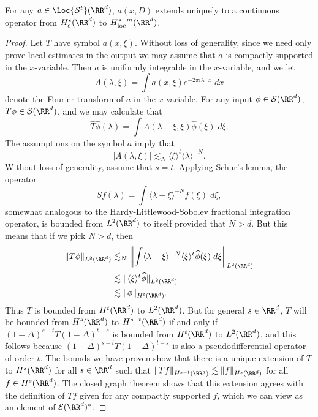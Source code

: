 \begin{theorem}
    For any $a \in \loc{\mathcal{S}^t}(\RR^d)$, $a(x,D)$ extends uniquely to a continuous operator from $H^s_c(\RR^d)$ to $H^{s-m}_{\text{loc}}(\RR^d)$.
\end{theorem}
\begin{proof}
    Let $T$ have symbol $a(x,\xi)$. Without loss of generality, since we need only prove local estimates in the output we may assume that $a$ is compactly supported in the $x$-variable. Then $a$ is uniformly integrable in the $x$-variable, and we let
    \[ A(\lambda,\xi) = \int a(x,\xi) e^{-2 \pi i \lambda \cdot x}\; dx \]
    denote the Fourier transform of $a$ in the $x$-variable. For any input $\phi \in \mathcal{S}(\RR^d)$, $T\phi \in \mathcal{S}(\RR^d)$, and we may calculate that
    \[ \widehat{T\phi}(\lambda) = \int A(\lambda - \xi,\xi) \widehat{\phi}(\xi)\; d\xi. \]
    The assumptions on the symbol $a$ imply that
    \[ |A(\lambda,\xi)| \lesssim_N \langle \xi \rangle^t \langle \lambda \rangle^{-N}. \]
    Without loss of generality, assume that $s = t$. Applying Schur's lemma, the operator
    \[ Sf(\lambda) = \int \langle \lambda - \xi \rangle^{-N} f(\xi)\; d\xi, \]
    somewhat analogous to the Hardy-Littlewood-Sobolev fractional integration operator, is bounded from $L^2(\RR^d)$ to itself provided that $N > d$. But this means that if we pick $N > d$, then
    \begin{align*}
        \| T\phi \|_{L^2(\RR^d)} &\lesssim_N \left\| \int \langle \lambda - \xi \rangle^{-N} \langle \xi \rangle^t \widehat{\phi}(\xi)\; d\xi \right\|_{L^2(\RR^d)}\\
        &\lesssim \| \langle \xi \rangle^t \widehat{\phi} \|_{L^2(\RR^d)}\\
        &\lesssim \| \phi \|_{H^t(\RR^d)}.
    \end{align*}
    Thus $T$ is bounded from $H^t(\RR^d)$ to $L^2(\RR^d)$. But for general $s \in \RR^d$, $T$ will be bounded from $H^s(\RR^d)$ to $H^{s-t}(\RR^d)$ if and only if $(1 - \Delta)^{s-t} T (1 - \Delta)^{t-s}$ is bounded from $H^t(\RR^d)$ to $L^2(\RR^d)$, and this follows because $(1 - \Delta)^{s-t} T (1 - \Delta)^{t-s}$ is also a pseudodifferential operator of order $t$. The bounds we have proven show that there is a unique extension of $T$ to $H^s(\RR^d)$ for all $s \in \RR^d$ such that $\| Tf \|_{H^{s-t}(\RR^d)} \lesssim \| f \|_{H^s(\RR^d)}$ for all $f \in H^s(\RR^d)$. The closed graph theorem shows that this extension agrees with the definition of $Tf$ given for any compactly supported $f$, which we can view as an element of $\mathcal{E}(\RR^d)^*$.
\end{proof}

